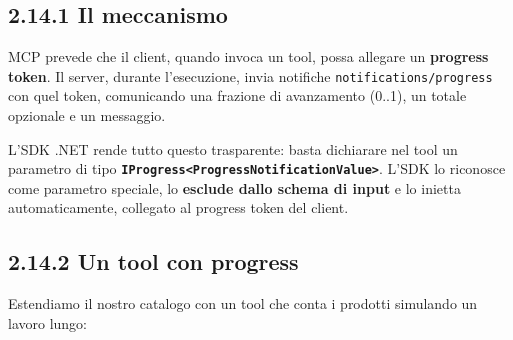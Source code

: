 \documentclass[
  italian,
  10pt,
]{book}
\begin{document}
\subsection{2.14.1 Il meccanismo}\label{il-meccanismo}

MCP prevede che il client, quando invoca un tool, possa allegare un
\textbf{progress token}. Il server, durante l'esecuzione, invia
notifiche \texttt{notifications/progress} con quel token, comunicando
una frazione di avanzamento (0..1), un totale opzionale e un messaggio.

L'SDK .NET rende tutto questo trasparente: basta dichiarare nel tool un
parametro di tipo
\textbf{\texttt{IProgress\textless{}ProgressNotificationValue\textgreater{}}}.
L'SDK lo riconosce come parametro speciale, lo \textbf{esclude dallo
schema di input} e lo inietta automaticamente, collegato al progress
token del client.

\subsection{2.14.2 Un tool con progress}\label{un-tool-con-progress}

Estendiamo il nostro catalogo con un tool che conta i prodotti simulando
un lavoro lungo:
\end{document}
